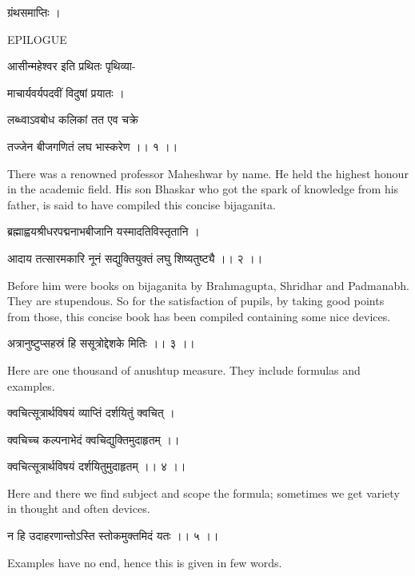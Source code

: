 \documentclass[]{article}
\date{}
\begin{document}
{ग्रंथसमाप्तिः । }

{EPILOGUE}

{आसीन्महेश्वर इति प्रथितः पृथिव्या- }

{माचार्यवर्यपदवीं विदुषां प्रयातः । }

{लब्ध्वाऽवबोध कलिकां तत एव चक्रे }

{तज्जेन बीजगणितं लघ भास्करेण ।। १ ।। }

{There was a renowned professor Maheshwar by name. He held the highest
honour in the academic field. His son Bhaskar who got the spark of
knowledge from his father, is said to have compiled this concise
bijaganita.}

{ब्रह्माह्वयश्रीधरपद्मनाभबीजानि यस्मादतिविस्तृतानि । }

{आदाय तत्सारमकारि नूनं सद्युक्तियुक्तं लघु शिष्यतुष्ट्यै ।। २ ।।}{ }

{Before him were books on bijaganita by Brahmagupta, Shridhar and
Padmanabh. They are stupendous. So for the satisfaction of pupils, by
taking good points from those, this concise book has been compiled
containing some nice devices. }

{अत्रानुष्टुप्सहस्रं हि ससूत्रोद्देशके मितिः ।। ३ ।।}{ }

{Here are one thousand of anushtup measure. They include formulas and
examples.}

{क्वचित्सूत्रार्थविषयं व्याप्तिं दर्शयितुं क्वचित् । }

{क्वचिच्च कल्पनाभेदं क्वचिद्युक्तिमुदाहृतम् ।। }

{क्वचित्सूत्रार्थविषयं दर्शयितुमुदाहृतम् ।। ४ ।।}{ }

{Here and there we find subject and scope the formula; sometimes we get
variety in thought and often devices.}

{न हि उदाहरणान्तोऽस्ति स्तोकमुक्तमिदं यतः ।। ५ ।। }

{Examples have no end, hence this is given in few words.\\
}
\end{document}
